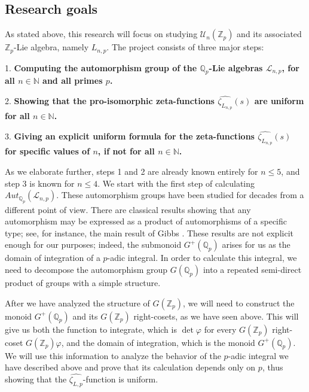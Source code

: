 \documentclass[12pt]{article}
\begin{document}
\subsection{Research goals}
As stated above, this research will focus on studying $\mathcal{U}_n(\mathbb{Z}_p)$ and its associated $\mathbb{Z}_p$-Lie algebra, namely $L_{n,p}$. The project consists of three major steps:\par
1. \textbf{Computing the automorphism group of the $\mathbb{Q}_p$-Lie algebras $\mathcal{L}_{n,p}$, for all $n\in\mathbb{N}$ and all primes $p$.}\par
2. \textbf{Showing that the pro-isomorphic zeta-functions $\hat{\zeta_{L_{n,p}}}(s)$ are uniform for all $n\in\mathbb{N}$.}\par
3. \textbf{Giving an explicit uniform formula for the zeta-functions $\hat{\zeta_{L_{n,p}}}(s)$ for specific values of $n$, if not for all $n\in\mathbb{N}$.}\par
As we elaborate further, steps 1 and 2 are already known entirely for $n\leq 5$, and step 3 is known for $n\leq 4$.
We start with the first step of calculating $Aut_{\mathbb{Q}_p}(\mathcal{L}_{n,p})$. These automorphism groups have been studied for decades from a different point of view.  There are classical results showing that any automorphism may be expressed as a product of automorphisms of a specific type; see, for instance, the main result of Gibbs \cite{Gibbs}.  These results are not explicit enough for our purposes; indeed, the submonoid $G^+(\mathbb{Q}_p)$ arises for us as the domain of integration of a $p$-adic integral.  In order to calculate this integral, we need to decompose the automorphism group $G(\mathbb{Q}_p)$ into a repeated semi-direct product of groups with a simple structure.
\par
After we have analyzed the structure of $G(\mathbb{Z}_p)$, we will need to construct the monoid $G^+(\mathbb{Q}_p)$ and its $G(\mathbb{Z}_p)$ right-cosets, as we have seen above. This will give us both the function to integrate, which is $\det\varphi$ for every $G(\mathbb{Z}_p)$ right-coset $G(\mathbb{Z}_p)\varphi$, and the domain of integration, which is the monoid $G^+(\mathbb{Q}_p)$. We will use this information to analyze the behavior of the $p$-adic integral we have described above and prove that its calculation depends only on $p$, thus showing that the $\hat{\zeta_{L,p}}$-function is uniform.
\end{document}
